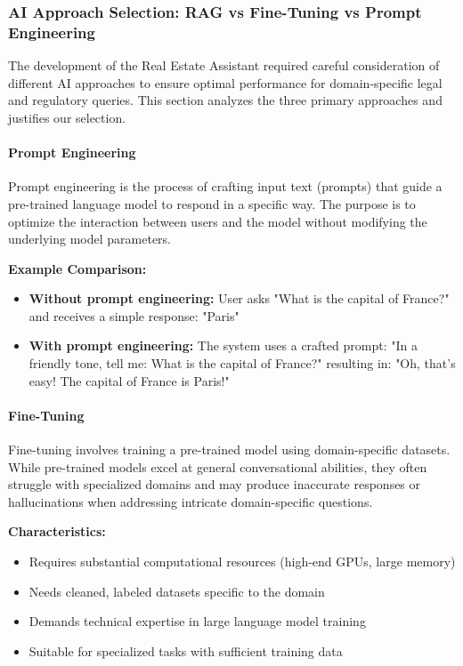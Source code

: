 \subsubsection{AI Approach Selection: RAG vs Fine-Tuning vs Prompt Engineering}

The development of the Real Estate Assistant required careful consideration of different AI approaches to ensure optimal performance for domain-specific legal and regulatory queries. This section analyzes the three primary approaches and justifies our selection.

\paragraph{Prompt Engineering}
Prompt engineering is the process of crafting input text (prompts) that guide a pre-trained language model to respond in a specific way. The purpose is to optimize the interaction between users and the model without modifying the underlying model parameters.

\textbf{Example Comparison:}
\begin{itemize}
    \item \textbf{Without prompt engineering:} User asks "What is the capital of France?" and receives a simple response: "Paris"
    \item \textbf{With prompt engineering:} The system uses a crafted prompt: "In a friendly tone, tell me: What is the capital of France?" resulting in: "Oh, that's easy! The capital of France is Paris!"
\end{itemize}

\paragraph{Fine-Tuning}
Fine-tuning involves training a pre-trained model using domain-specific datasets. While pre-trained models excel at general conversational abilities, they often struggle with specialized domains and may produce inaccurate responses or hallucinations when addressing intricate domain-specific questions.

\textbf{Characteristics:}
\begin{itemize}
    \item Requires substantial computational resources (high-end GPUs, large memory)
    \item Needs cleaned, labeled datasets specific to the domain
    \item Demands technical expertise in large language model training
    \item Suitable for specialized tasks with sufficient training data
\end{itemize}

